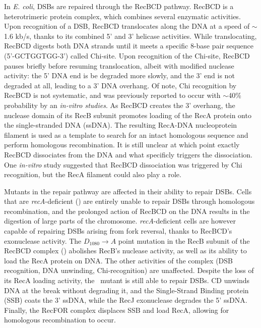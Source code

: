 In \emph{E. coli}, DSBs are repaired through the RecBCD pathway. RecBCD is a heterotrimeric protein complex, which combines several enzymatic activities\cite{Dillingham2008}. Upon recognition of a DSB, RecBCD translocates along the DNA at a speed of $\sim$1.6 kb/s, thanks to its combined 5' and 3' helicase activities\cite{Wiktor2018}. While translocating, RecBCD digests both DNA strands until it meets a specific 8-base pair sequence (5'-GCTGGTGG-3') called Chi-site. Upon recognition of the Chi-site, RecBCD pauses briefly before resuming translocation, albeit with modified nuclease activity: the 5' DNA end is be degraded more slowly, and the 3' end is not degraded at all, leading to a 3' DNA overhang. Of note, Chi recognition by RecBCD is not systematic, and was previously reported to occur with $\sim$40\% probability by an \emph{in-vitro studies}\cite{Taylor1992}. As RecBCD creates the 3' overhang, the nuclease domain of its RecB subunit promotes loading of the RecA protein onto the single-stranded DNA (ssDNA)\cite{Churchill2000, Spies2006}. The resulting RecA-DNA nucleoprotein filament is used as a template to search for an intact homologous sequence and perform homologous recombination. It is still unclear at which point exactly RecBCD dissociates from the DNA and what specificly triggers the dissociation. One \emph{in-vitro} study suggested that RecBCD dissociation was triggered by Chi recognition\cite{Taylor1999}, but the RecA filament could also play a role.

Mutants in the repair pathway are affected in their ability to repair DSBs. Cells that are \emph{recA}-deficient (\dreca) are entirely unable to repair DSBs through homologous recombination, and the prolonged action of RecBCD on the DNA results in the digestion of large parts of the chromosome\cite{Horii1968, Chow2007}. \emph{recA}-deficient cells are however capable of repairing DSBs arising from fork reversal, thanks to RecBCD's exonuclease activity\cite{Seigneur1998, Michel2001}. The $D_{1080} \rightarrow A$ point mutation in the RecB subunit of the RecBCD complex (\teneighty) abolishes RecB's nuclease activity, as well as its ability to load the RecA protein on DNA\cite{Yu1998, Wang2000}. The other activities of the complex (DSB recognition, DNA unwinding, Chi-recognition) are unaffected\cite{Anderson1999}. Despite the loss of its RecA loading activity, the \teneighty\ mutant is still able to repair DSBs. \teneighty CD unwinds DNA at the break without degrading it, and the Single-Strand Binding protein (SSB) coats the 3' ssDNA, while the RecJ exonuclease degrades the 5' ssDNA. Finally, the RecFOR complex displaces SSB and load RecA, allowing for homologous recombination to occur\cite{Ivancic-Bace_2003}.


